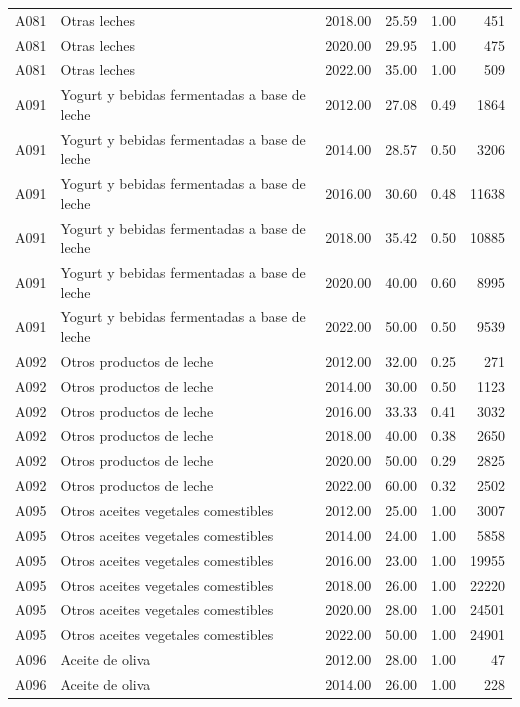 \begin{table}[ht]
\begin{tabular}{llrrrr}
  A081 & Otras leches & 2018.00 & 25.59 & 1.00 & 451 \\ 
  A081 & Otras leches & 2020.00 & 29.95 & 1.00 & 475 \\ 
  A081 & Otras leches & 2022.00 & 35.00 & 1.00 & 509 \\ 
  A091 & Yogurt y bebidas fermentadas a base de leche & 2012.00 & 27.08 & 0.49 & 1864 \\ 
  A091 & Yogurt y bebidas fermentadas a base de leche & 2014.00 & 28.57 & 0.50 & 3206 \\ 
  A091 & Yogurt y bebidas fermentadas a base de leche & 2016.00 & 30.60 & 0.48 & 11638 \\ 
  A091 & Yogurt y bebidas fermentadas a base de leche & 2018.00 & 35.42 & 0.50 & 10885 \\ 
  A091 & Yogurt y bebidas fermentadas a base de leche & 2020.00 & 40.00 & 0.60 & 8995 \\ 
  A091 & Yogurt y bebidas fermentadas a base de leche & 2022.00 & 50.00 & 0.50 & 9539 \\ 
  A092 & Otros productos de leche & 2012.00 & 32.00 & 0.25 & 271 \\ 
  A092 & Otros productos de leche & 2014.00 & 30.00 & 0.50 & 1123 \\ 
  A092 & Otros productos de leche & 2016.00 & 33.33 & 0.41 & 3032 \\ 
  A092 & Otros productos de leche & 2018.00 & 40.00 & 0.38 & 2650 \\ 
  A092 & Otros productos de leche & 2020.00 & 50.00 & 0.29 & 2825 \\ 
  A092 & Otros productos de leche & 2022.00 & 60.00 & 0.32 & 2502 \\ 
  A095 & Otros aceites vegetales comestibles & 2012.00 & 25.00 & 1.00 & 3007 \\ 
  A095 & Otros aceites vegetales comestibles & 2014.00 & 24.00 & 1.00 & 5858 \\ 
  A095 & Otros aceites vegetales comestibles & 2016.00 & 23.00 & 1.00 & 19955 \\ 
  A095 & Otros aceites vegetales comestibles & 2018.00 & 26.00 & 1.00 & 22220 \\ 
  A095 & Otros aceites vegetales comestibles & 2020.00 & 28.00 & 1.00 & 24501 \\ 
  A095 & Otros aceites vegetales comestibles & 2022.00 & 50.00 & 1.00 & 24901 \\ 
  A096 & Aceite de oliva & 2012.00 & 28.00 & 1.00 &  47 \\ 
  A096 & Aceite de oliva & 2014.00 & 26.00 & 1.00 & 228 \\ 

\end{tabular}
\end{table}
